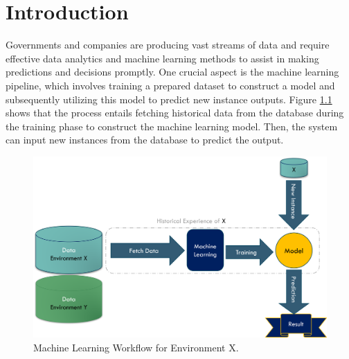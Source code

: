 
\chapter{Introduction}
\label{cha:1_Introduction}

\ifpdf
    \graphicspath{{1_introduction/figures/PNG/}{1_introduction/figures/PDF/}{1_introduction/figures/}}
\else
    \graphicspath{{1_introduction/figures/EPS/}{1_introduction/figures/}}
\fi



Governments and companies are producing vast streams of data and require effective data analytics and machine learning methods to assist in making predictions and decisions promptly. One crucial aspect is the machine learning pipeline, which involves training a prepared dataset to construct a model and subsequently utilizing this model to predict new instance outputs. Figure \ref{fig:machine-old-senario} shows that the process entails fetching historical data from the database during the training phase to construct the machine learning model. Then, the system can input new instances from the database to predict the output.

\begin{figure}[!ht]
    \centering
    \includegraphics[width=.9\textwidth]{1_introduction/figures/PNG/machine_flow.png}
    \caption{Machine Learning Workflow for Environment X.}
    \label{fig:machine-old-senario}
\end{figure}


